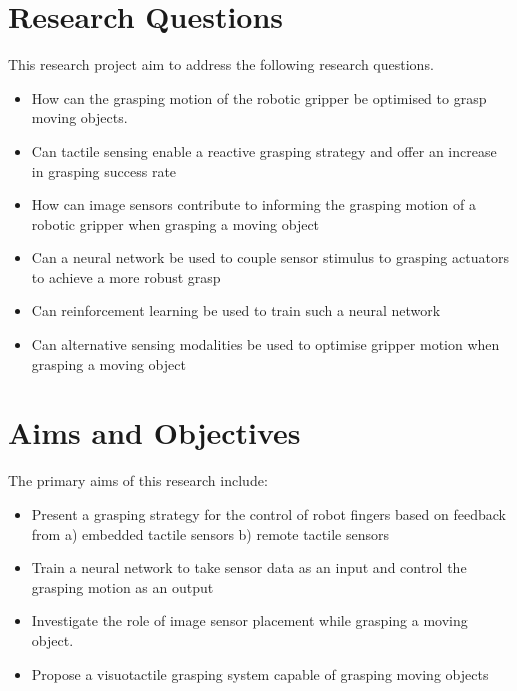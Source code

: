 \section{Research Questions}
This research project aim to address the following research questions.
\begin{itemize}
\item How can the grasping motion of the robotic gripper be optimised to grasp moving objects. 
\item Can tactile sensing enable a reactive grasping strategy and offer an increase in grasping success rate 
\item How can image sensors contribute to informing the grasping motion of a robotic gripper when grasping a moving object
\item Can a neural network be used to couple sensor stimulus to grasping actuators to achieve a more robust grasp
\item Can reinforcement learning be used to train such a neural network
\item Can alternative sensing modalities be used to optimise gripper motion when grasping a moving object
\end{itemize}

\section{Aims and Objectives}
The primary aims of this research include:

\begin{itemize}
    
\item Present a grasping strategy for the control of robot fingers based on feedback from a) embedded tactile sensors b) remote tactile sensors
\item Train a neural network to take sensor data as an input and control the grasping motion as an output
\item Investigate the role of image sensor placement while grasping a moving object.
\item Propose a visuotactile grasping system capable of grasping moving objects
\end{itemize}

